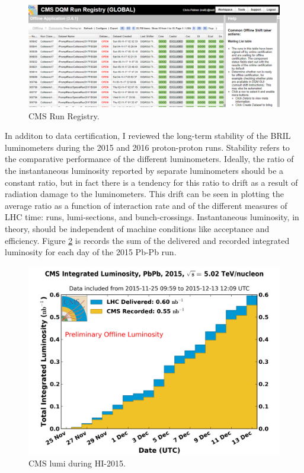 \begin{figure}[h!]
\begin{centering}
\includegraphics[width=6in]{Chapter4/importfigs/chris_palmer_run_registry.png}
\par\end{centering}
\caption{CMS Run Registry. \label{fig:runRegistry}}
\end{figure}

In additon to data certification, I reviewed the long-term stability of the BRIL luminometers during the 2015 and 2016 proton-proton runs. Stability refers to the comparative performance of the different luminometers. Ideally, the ratio of the instantaneous luminosity reported by separate luminometers should be a constant ratio, but in fact there is a tendency for this ratio to drift as a result of radiation damage to the luminometers. This drift can be seen in plotting the average ratio as a function of interaction rate and of the different measures of LHC time: runs, lumi-sections, and bunch-crossings.  Instantaneous luminosity, in theory, should be independent of machine conditions like acceptance and efficiency. Figure \ref{fig:lumiHi2015} is records the sum of the delivered and recorded integrated luminosity for each day of the 2015 Pb-Pb run. 

\begin{figure}[h!]
\begin{centering}
\includegraphics[width=5in]{Chapter4/importfigs/int_lumi_per_day_cumulative_pbpb_2015_pbpb.png}
\par\end{centering}
\caption{CMS lumi during HI-2015. \label{fig:lumiHi2015}}
\end{figure}

